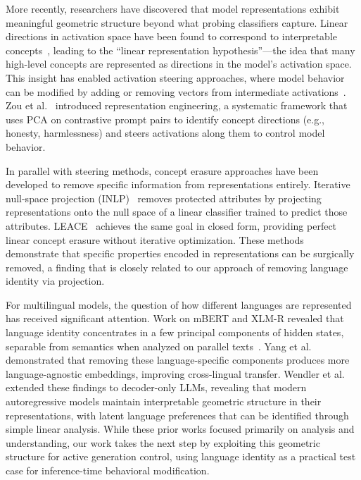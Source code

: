 More recently, researchers have discovered that model representations exhibit meaningful geometric structure beyond what probing classifiers capture. Linear directions in activation space have been found to correspond to interpretable concepts~\cite{mikolov2013linguistic,park2023linear}, leading to the ``linear representation hypothesis''---the idea that many high-level concepts are represented as directions in the model's activation space. This insight has enabled activation steering approaches, where model behavior can be modified by adding or removing vectors from intermediate activations~\cite{turner2023activation,li2024inference}. Zou et al.~\cite{zou2023representation} introduced representation engineering, a systematic framework that uses PCA on contrastive prompt pairs to identify concept directions (e.g., honesty, harmlessness) and steers activations along them to control model behavior.

In parallel with steering methods, concept erasure approaches have been developed to remove specific information from representations entirely. Iterative null-space projection (INLP)~\cite{ravfogel2020null} removes protected attributes by projecting representations onto the null space of a linear classifier trained to predict those attributes. LEACE~\cite{belrose2023leace} achieves the same goal in closed form, providing perfect linear concept erasure without iterative optimization. These methods demonstrate that specific properties encoded in representations can be surgically removed, a finding that is closely related to our approach of removing language identity via projection.

For multilingual models, the question of how different languages are represented has received significant attention. Work on mBERT and XLM-R revealed that language identity concentrates in a few principal components of hidden states, separable from semantics when analyzed on parallel texts~\cite{conneau2020emerging,chi2020finding}. Yang et al.~\cite{yang2021simple} demonstrated that removing these language-specific components produces more language-agnostic embeddings, improving cross-lingual transfer. Wendler et al.~\cite{wendler2024llamas} extended these findings to decoder-only LLMs, revealing that modern autoregressive models maintain interpretable geometric structure in their representations, with latent language preferences that can be identified through simple linear analysis. While these prior works focused primarily on analysis and understanding, our work takes the next step by exploiting this geometric structure for active generation control, using language identity as a practical test case for inference-time behavioral modification.

